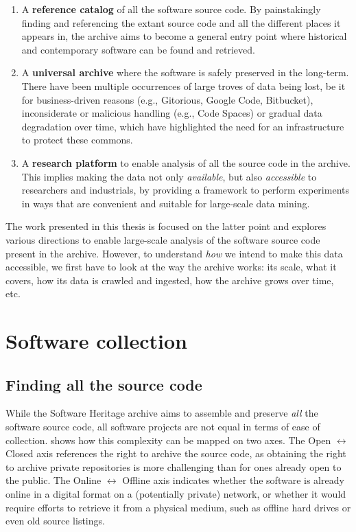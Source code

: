 \begin{enumerate}
    \item A \textbf{reference catalog} of all the software source code. By
        painstakingly finding and referencing the extant source code and
        all the different places it appears in, the archive aims to become a
        general entry point where historical and contemporary software can be
        found and retrieved.
    \item A \textbf{universal archive} where the software is safely preserved
        in the long-term. There have been multiple occurrences of large troves
        of data being lost, be it for business-driven reasons (e.g., Gitorious,
        Google Code, Bitbucket), inconsiderate or malicious handling (e.g.,
        Code Spaces) or gradual data degradation over time, which have
        highlighted the need for an infrastructure to protect these commons.
    \item A \textbf{research platform} to enable analysis of all the source
        code in the archive. This implies making the data not only
        \emph{available}, but also \emph{accessible} to researchers and
        industrials, by providing a framework to perform experiments in ways
        that are convenient and suitable for large-scale data mining.
\end{enumerate}

The work presented in this thesis is focused on the latter point and explores
various directions to enable large-scale analysis of the software source code
present in the archive. However, to understand \emph{how} we intend to make
this data accessible, we first have to look at the way the archive works: its
scale, what it covers, how its data is crawled and ingested, how the archive
grows over time, etc.

\section{Software collection}

\subsection{Finding all the source code}

While the Software Heritage archive aims to assemble and preserve \emph{all}
the software source code, all software projects are not equal in terms of ease of
collection.  shows how this complexity can be
mapped on two axes. The Open $\leftrightarrow$ Closed axis references the right
to archive the source code, as obtaining the right to archive private
repositories is more challenging than for ones already open to the public.  The
Online $\leftrightarrow$ Offline axis indicates whether the software is already
online in a digital format on a (potentially private) network, or whether it
would require efforts to retrieve it from a physical medium, such as offline
hard drives or even old source listings.

